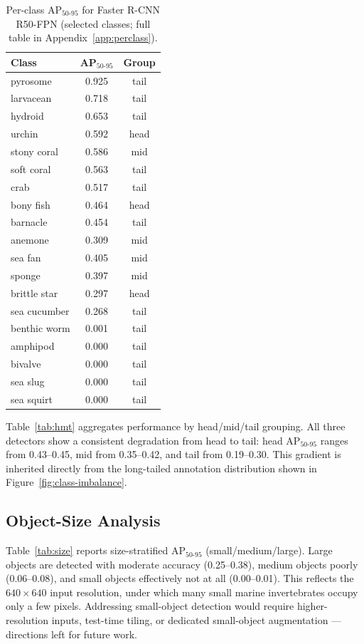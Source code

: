 \documentclass[11pt,a4paper]{article}
\begin{document}
\begin{table}[H]
\centering
\small
\caption{Per-class AP$_{50\text{-}95}$ for Faster R-CNN R50-FPN (selected classes; full table in Appendix~\ref{app:perclass}).}
\label{tab:perclass}
\begin{tabular}{@{}lcc@{}}
\toprule
Class & AP$_{50\text{-}95}$ & Group \\
\midrule
pyrosome & 0.925 & tail \\
larvacean & 0.718 & tail \\
hydroid & 0.653 & tail \\
urchin & 0.592 & head \\
stony coral & 0.586 & mid \\
soft coral & 0.563 & tail \\
crab & 0.517 & tail \\
bony fish & 0.464 & head \\
barnacle & 0.454 & tail \\
anemone & 0.309 & mid \\
sea fan & 0.405 & mid \\
sponge & 0.397 & mid \\
brittle star & 0.297 & head \\
sea cucumber & 0.268 & tail \\
benthic worm & 0.001 & tail \\
amphipod & 0.000 & tail \\
bivalve & 0.000 & tail \\
sea slug & 0.000 & tail \\
sea squirt & 0.000 & tail \\
\bottomrule
\end{tabular}
\end{table}

Table~\ref{tab:hmt} aggregates performance by head/mid/tail grouping. All three detectors show a consistent degradation from head to tail: head AP$_{50\text{-}95}$ ranges from 0.43--0.45, mid from 0.35--0.42, and tail from 0.19--0.30. This gradient is inherited directly from the long-tailed annotation distribution shown in Figure~\ref{fig:class-imbalance}.

\subsection{Object-Size Analysis}
\label{sec:results-size}
Table~\ref{tab:size} reports size-stratified AP$_{50\text{-}95}$ (small/medium/large). Large objects are detected with moderate accuracy (0.25--0.38), medium objects poorly (0.06--0.08), and small objects effectively not at all (0.00--0.01). This reflects the $640\times640$ input resolution, under which many small marine invertebrates occupy only a few pixels. Addressing small-object detection would require higher-resolution inputs, test-time tiling, or dedicated small-object augmentation --- directions left for future work.
\end{document}
